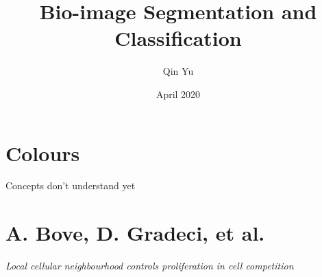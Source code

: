 \documentclass[a4paper,11pt]{article}
\title{Bio-image Segmentation and Classification}
\author{Qin Yu}
\date{April 2020}
\begin{document}
\maketitle

\section{Colours}
\begin{description}
    \item[Concepts don't understand yet] 
\end{description}

\section{A. Bove, D. Gradeci, et al.} \textit{Local cellular neighbourhood controls proliferation in cell competition} \cite{bove2017local}
\end{document}
